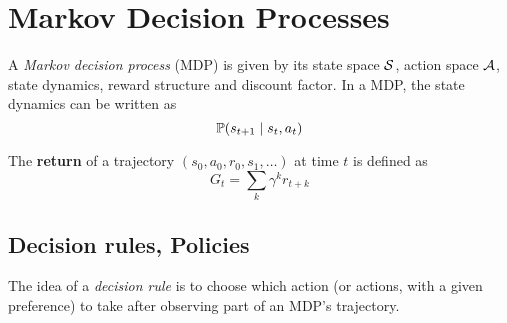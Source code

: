 \documentclass[../course-notes.tex]{subfiles}
\begin{document}
\chapter{Markov Decision Processes}


\begin{defn}
	A \emph{Markov decision process} (MDP) is given by its state space $\mathcal{S}$, action space $\mathcal{A}$, state dynamics, reward structure and discount factor. In a MDP, the state dynamics can be written as
	\[
		\mathbb{P}(s_{t+1} \mid s_t, a_t)
	\]
\end{defn}

The \textbf{\bluefont return} of a trajectory $(s_0,a_0,r_0,s_1,\ldots)$ at time $t$ is defined as
\begin{equation}
	G_t = \sum_{k} \gamma^k r_{t+k}
\end{equation}



\section{Decision rules, Policies}

The idea of a \textit{decision rule} is to choose which action (or actions, with a given preference) to take after observing part of an MDP's trajectory.
\end{document}

